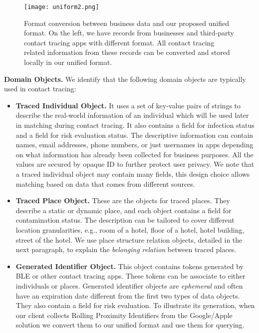 \begin{figure}
\centering
\texttt{[image: uniform2.png]}
\caption{Format conversion between business data and our proposed unified format. On the left, we have records from businesses and third-party contact tracing apps with different format. All contact tracing related information from these records can be converted and stored locally in our unified format.}
\label{busidata}
\end{figure}

\textbf{Domain Objects.} We identify that the following domain objects are typically used in contact tracing:
        \begin{itemize}
            \item \textbf{Traced Individual Object.} It uses a set of key-value pairs of strings to describe the real-world information of an individual which will be used later in matching during contact tracing. It also contains a field for infection status and a field for risk evaluation status. The descriptive information can contain names, email addresses, phone numbers, or just usernames in apps depending on what information has already been collected for business purposes. All the values are secured by opaque ID to further protect user privacy. We note that a traced individual object may contain many fields, this design choice allows matching based on data that comes from different sources. 
            
            \item \textbf{Traced Place Object. }These are the objects for traced places. 
            They describe a static or dynamic place, and each object contains a field for contamination status. 
            The description can be tailored to cover different location granularities, e.g., room of a hotel, floor of a hotel, hotel building, street of the hotel. We use place structure relation objects, detailed in the next paragraph, to explain the \emph{belonging relation} between traced places.
            
        
            \item \textbf{Generated Identifier Object. }This object contains tokens generated by BLE or other contact tracing apps. These tokens can be associate to either individuals or places. Generated identifier objects are \emph{ephemeral} and often have an expiration date different from the first two types of data  objects. They also contain a field for risk evaluation. To illustrate its generation, when our client collects Rolling Proximity Identifiers from the Google/Apple solution we convert them to our unified format and use them for querying. 

        
        \end{itemize}
